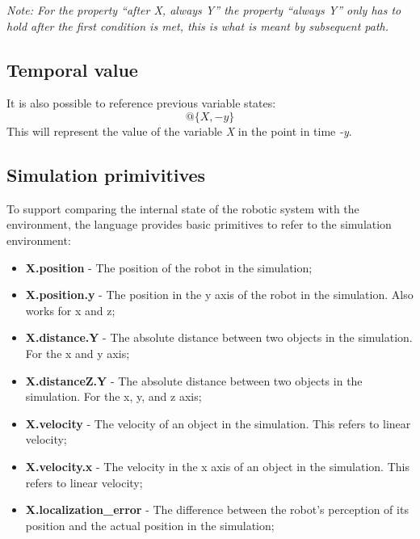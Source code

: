 \textit{Note: For the property ``after X, always Y'' the property ``always Y'' only has to hold after the first condition is met, this is what is meant by subsequent path.}

\subsection{Temporal value}
\label{ssec:tempvalues}

It is also possible to reference previous variable states:
\begin{equation}
@\{X, -y\}
\end{equation}
This will represent the value of the variable \textit{X} in the point in time \textit{-y}.


\subsection{Simulation primivitives}
\label{ssec:simprimitives}

To support comparing the internal state of the robotic system with the environment, the language provides basic primitives to refer to the simulation environment:

\begin{itemize}
\item {\bfseries X.position} - The position of the robot in the simulation;
\item {\bfseries X.position.y} - The position in the y axis of the robot in the simulation. Also works for x and z;
\item {\bfseries X.distance.Y} - The absolute distance between two objects in the simulation. For the x and y axis;
\item {\bfseries X.distanceZ.Y} - The absolute distance between two objects in the simulation. For the x, y, and z axis;
\item {\bfseries X.velocity} - The velocity of an object in the simulation. This refers to linear velocity;
\item {\bfseries X.velocity.x} - The velocity in the x axis of an object in the simulation. This refers to linear velocity;
\item {\bfseries X.localization\_error} - The difference between the robot's perception of its position and the actual position in the simulation;
\end{itemize}



